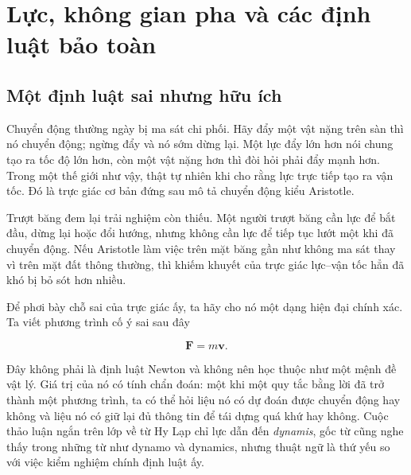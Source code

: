 \chapter{Lực, không gian pha và các định luật bảo toàn}


\section{Một định luật sai nhưng hữu ích}

Chuyển động thường ngày bị ma sát chi phối. Hãy đẩy một vật nặng trên sàn thì nó chuyển động; ngừng đẩy và nó sớm dừng lại. Một lực đẩy lớn hơn nói chung tạo ra tốc độ lớn hơn, còn một vật nặng hơn thì đòi hỏi phải đẩy mạnh hơn. Trong một thế giới như vậy, thật tự nhiên khi cho rằng lực trực tiếp tạo ra vận tốc. Đó là trực giác cơ bản đứng sau mô tả chuyển động kiểu Aristotle.

Trượt băng đem lại trải nghiệm còn thiếu. Một người trượt băng cần lực để bắt đầu, dừng lại hoặc đổi hướng, nhưng không cần lực để tiếp tục lướt một khi đã chuyển động. Nếu Aristotle làm việc trên mặt băng gần như không ma sát thay vì trên mặt đất thông thường, thì khiếm khuyết của trực giác lực--vận tốc hẳn đã khó bị bỏ sót hơn nhiều.

Để phơi bày chỗ sai của trực giác ấy, ta hãy cho nó một dạng hiện đại chính xác. Ta viết phương trình cố ý sai sau đây

\begin{equation}
  \mathbf F=m\mathbf v.
  \label{eq:aristotle-vector-law}
\end{equation}

Đây không phải là định luật Newton và không nên học thuộc như một mệnh đề vật lý. Giá trị của nó có tính chẩn đoán: một khi một quy tắc bằng lời đã trở thành một phương trình, ta có thể hỏi liệu nó có dự đoán được chuyển động hay không và liệu nó có giữ lại đủ thông tin để tái dựng quá khứ hay không. Cuộc thảo luận ngắn trên lớp về từ Hy Lạp chỉ lực dẫn đến \emph{dynamis}, gốc từ cũng nghe thấy trong những từ như dynamo và dynamics, nhưng thuật ngữ là thứ yếu so với việc kiểm nghiệm chính định luật ấy.

